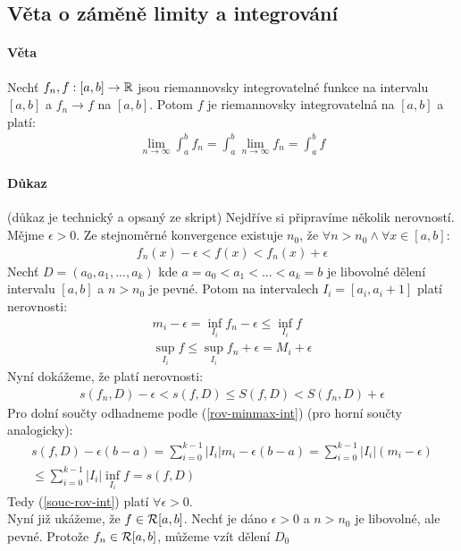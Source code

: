 \documentclass[a4paper,10pt]{article}
\begin{document}
\subsection{Věta o záměně limity a integrování}
\setcounter{equation}{0}
\paragraph{Věta}
Nechť $f_n, f: [a,b] \to \mathbb{R}$ jsou riemannovsky integrovatelné funkce na
intervalu $[a,b]$ a $f_n \to f$ na $[a,b]$. Potom $f$ je riemannovsky
integrovatelná na $[a,b]$ a platí:
\begin{align*}
	\lim_{n \to \infty} \int_a^b f_n = \int_a^b \lim_{n \to \infty} f_n =
	\int_a^b f
\end{align*}
\paragraph{Důkaz} (důkaz je technický a opsaný ze skript)
Nejdříve si připravíme několik nerovností. Mějme $\epsilon > 0$. Ze stejnoměrné 
konvergence existuje $n_0$, že $\forall n > n_0 \land \forall x \in [a,b]$:
\begin{align}
f_n(x) - \epsilon < f(x) < f_n(x) + \epsilon
\end{align}
Nechť $D = (a_0, a_1, ..., a_k)$ kde $a = a_0 < a_1 < ... < a_k = b$ je libovolné
dělení intervalu $[a,b]$ a $n > n_0$ je pevné. Potom na intervalech $I_i = [a_i,
a_i+1]$ platí nerovnosti:
\begin{align}
	\label{rov-minmax-int} m_i - \epsilon = \inf_{I_i} f_n - \epsilon \le \inf_{I_i} f \\
	\sup_{I_i} f \le \sup_{I_i} f_n + \epsilon = M_i + \epsilon
\end{align}
Nyní dokážeme, že platí nerovnosti:
\begin{align}
	\label{souc-rov-int} s(f_n, D) - \epsilon < s(f, D) \le S(f, D) < S(f_n, D) + \epsilon
\end{align}
Pro dolní součty odhadneme podle (\ref{rov-minmax-int}) (pro horní součty
analogicky):
\begin{align}
	s(f, D) - \epsilon(b-a) = \sum_{i=0}^{k-1} |I_i| m_i - \epsilon(b-a) =
	\sum_{i=0}^{k-1} |I_i| (m_i - \epsilon ) \\
	\le \sum_{i=0}^{k-1} |I_i| \inf_{I_i} f = s(f, D)
\end{align}
Tedy (\ref{souc-rov-int}) platí $\forall \epsilon > 0$. \\
Nyní již ukážeme, že $f \in \mathcal{R}[a,b]$. Nechť je dáno $\epsilon > 0$ a $n > n_0$
je libovolné, ale pevné. Protože $f_n \in \mathcal{R}[a,b]$, můžeme vzít dělení $D_0$
\end{document}
